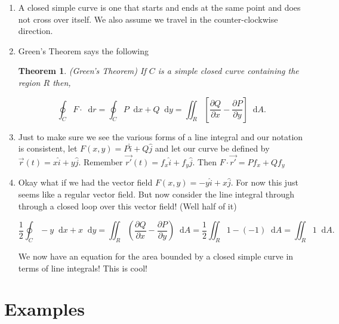 \documentclass[11pt]{article}
\newtheorem{theorem}{Theorem}
\newcommand*\dif{\mathop{}\!\mathrm{d}}
\begin{document}
\begin{enumerate}
\item A closed simple curve is one that starts and ends at the same point and does not cross over itself. We also assume we travel in the counter-clockwise direction.

\item Green's Theorem says the following

\begin{theorem}(Green's Theorem)
If $C$ is a simple closed curve containing the region $R$ then,

\begin{equation*}
       \oint_C F \cdot \dif{r} =  \oint_C P \dif{x} + Q \dif{y} = \iint_R \left[\frac{\partial Q}{\partial x} - \frac{\partial P}{\partial y}\right] \dif{A}.
\end{equation*}
\end{theorem}




\item Just to make sure we see the various forms of a line integral and our notation is consistent, let $F(x,y) = P\hat{i} + Q \hat{j}$ and let our curve be defined by $\vec{r}(t) = x\hat{i} + y\hat{j}$. Remember $\vec{r'}(t) = f_x \hat{i} + f_y \hat{j}$. Then $F\cdot \vec{r'} = P f_x + Q f_y$


\item Okay what if we had the vector field $F(x,y) = -y \hat{i} + x\hat{j}$. For now this just seems like a regular vector field. But now consider the line integral through through a closed loop over this vector field! (Well half of it)

\begin{equation*}
    \frac{1}{2}\oint_C -y \dif{x} + x\dif{y} = \iint_R \left(  \frac{\partial Q}{\partial x}    - \frac{\partial P}{\partial y} \right) \dif{A} = \frac{1}{2} \iint_R 1 - (-1) \dif{A} = \iint_R 1 \dif{A}.
\end{equation*}

We now have an equation for the area bounded by a closed simple curve in terms of line integrals! This is cool!





\end{enumerate}




\section{Examples}
\end{document}
